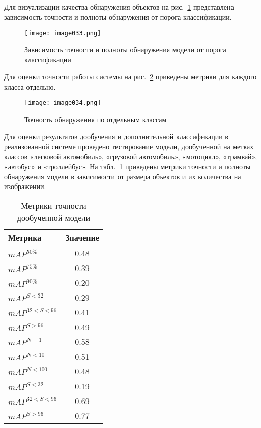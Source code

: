 Для визуализации качества обнаружения объектов на рис.~\ref{fig:image033} представлена зависимость точности и полноты обнаружения от порога классификации.

\begin{figure}[htbp]
\centering
\texttt{[image: image033.png]}
\caption{Зависимость точности и полноты обнаружения модели от порога классификации}%
\label{fig:image033}
\end{figure}

Для оценки точности работы системы на рис.~\ref{fig:image034} приведены метрики для каждого класса отдельно.

\begin{figure}[htbp]
\centering
\texttt{[image: image034.png]}
\caption{Точность обнаружения по отдельным классам}%
\label{fig:image034}
\end{figure}

Для оценки результатов дообучения и дополнительной классификации в реализованной системе проведено тестирование модели, дообученной на метках классов «легковой автомобиль», «грузовой автомобиль», «мотоцикл», «трамвай», «автобус» и «троллейбус». На табл.~\ref{tabular:tab_exp_3} приведены метрики точности и полноты обнаружения модели в зависимости от размера объектов и их количества на изображении.

\begin{table}[H]
	\def\arraystretch{1.3}
	\caption{Метрики точности дообученной модели}
	\begin{center}
		\begin{tabular}{|l|c|}
			\hline
			Метрика & Значение\\  \hline			
			\(mAP^{50\%}\) & 0.48\\ \hline			
			\(mAP^{75\%}\) & 0.39\\ \hline
			\(mAP^{90\%}\) & 0.20\\ \hline
			\(mAP^{S<32}\) & 0.29\\ \hline
			\(mAP^{32<S<96}\) & 0.41\\ \hline
			\(mAP^{S>96}\) & 0.49\\ \hline
			\(mAP^{N=1}\) & 0.58\\ \hline
			\(mAP^{N<10}\) & 0.51\\ \hline
			\(mAP^{N<100}\) & 0.48\\ \hline
			\(mAP^{S<32}\) & 0.19\\ \hline
			\(mAP^{32<S<96}\) & 0.69\\ \hline
			\(mAP^{S>96}\) & 0.77\\ \hline			
		\end{tabular}
		\label{tabular:tab_exp_3}
	\end{center}
\end{table}

